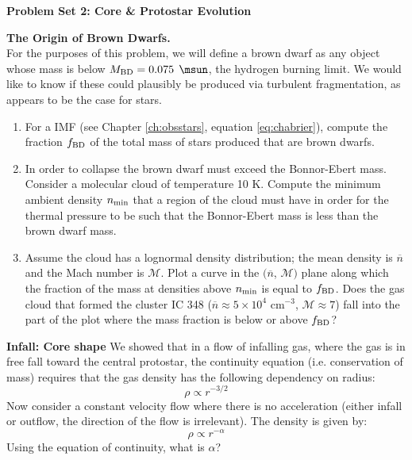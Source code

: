 \documentclass[twoside]{tufte-book} %
\begin{document}
\noindent\textbf{Problem Set 2: Core \& Protostar Evolution}

\item \textbf{The Origin of Brown Dwarfs.}\\
For the purposes of this problem, we will define a brown dwarf as any object whose mass is below $M_{\rm BD} = 0.075$ $\msun$, the hydrogen burning limit. We would like to know if these could plausibly be produced via turbulent fragmentation, as appears to be the case for stars.
\begin{enumerate}
\item For a \citet{chabrier05a} IMF (see Chapter \ref{ch:obsstars}, equation \ref{eq:chabrier}), compute the fraction $f_{\rm BD}$ of the total mass of stars produced that are brown dwarfs.
\item In order to collapse the brown dwarf must exceed the Bonnor-Ebert mass. Consider a molecular cloud of temperature 10 K. Compute the minimum ambient density $n_{\rm min}$ that a region of the cloud must have in order for the thermal pressure to be such that the Bonnor-Ebert mass is less than the brown dwarf mass.
\item Assume the cloud has a lognormal density distribution; the mean density is $\overline{n}$ and the Mach number is $\mathcal{M}$. Plot a curve in the $(\overline{n}$, $\mathcal{M})$ plane along which the fraction of the mass at densities above $n_{\rm min}$ is equal to $f_{\rm BD}$. Does the gas cloud that formed the cluster IC 348 ($\overline{n} \approx 5\times 10^4$ cm$^{-3}$, $\mathcal{M}\approx 7$) fall into the part of the plot where the mass fraction is below or above $f_{\rm BD}$?
\end{enumerate}

\item \textbf{Infall: Core shape}
We showed that in a flow of infalling gas, where the gas is in free fall toward the central
protostar, the continuity equation (i.e. conservation of mass) requires that the gas density
has the following dependency on radius:
\begin{equation}
    \rho\propto r^{-3/2} 
\end{equation}
Now consider a constant velocity flow where there is no acceleration (either infall or outflow,
the direction of the flow is irrelevant). The density is given by:
\begin{equation}
\rho \propto r^{-\alpha}
\end{equation}
Using the equation of continuity, what is $\alpha$?
\end{document}
